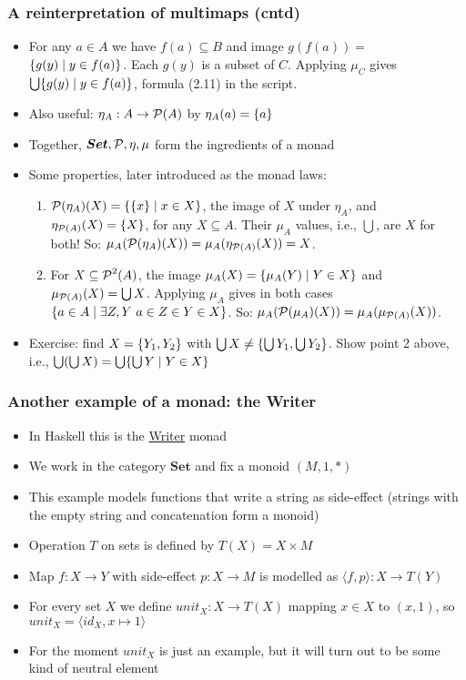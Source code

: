 \documentclass[handout]{beamer}
\newcommand{\bfsf}[1]{{\boldsymbol{#1}}}
\newcommand{\Set}{\bfsf{Set}}
\newcommand{\Kp}[1]{{\langle #1 \rangle}}
\begin{document}
\frame
  {   
    \frametitle{A reinterpretation of multimaps (cntd)}\label{Mon5:MultiMapReint}

 \begin{itemize}[<+->]
\item For any $a\in A$ we have $f(a)\subseteq B$ and {\color{red}image}
$g(f(a)) =$ $ \{g(y) \mid y\in f(a)\}$. Each $g(y)$ is a subset of $C$.
Applying $\mu_C$ gives $\bigcup \{g(y) \mid y\in f(a)\}$, formula (2.11)
in the script.
\item Also useful: $\eta_A: A \to \operatorname{\mathcal{P}}(A)$ by $\eta_A(a)=\{a\}$
\item Together, $\Set, \powset, \eta, \mu$ form the ingredients of a monad
\item Some properties, later introduced as the monad laws: 
 \begin{enumerate}
\item $\operatorname{\mathcal{P}}(\eta_A)(X) = \{\{x\}\mid x\in X\}$,
the {\color{red}image} of $X$ under $\eta_A$, and $\eta_{\operatorname{\mathcal{P}}(A)}(X) = \{X\}$,
for any $X\subseteq A$. Their $\mu_A$ values, i.e., $\bigcup$, are $X$ for both!
So: $\mu_A(\operatorname{\mathcal{P}}(\eta_A)(X)) = \mu_A(\eta_{\operatorname{\mathcal{P}}(A)}(X)) = X$.
\item For $X\subseteq \operatorname{\mathcal{P}}^2(A)$, the {\color{red}image} 
$\mu_A(X) = \{\mu_A(Y)\mid Y\in X\}$
and $\mu_{\operatorname{\mathcal{P}}(A)}(X)=\bigcup X$. Applying $\mu_A$ gives in both cases
$\set{a\in A \mid \linebreak \exists Z,Y~a\in Z\in Y \in X}$. 
So: 
$\mu_A(\operatorname{\mathcal{P}}(\mu_A)(X)) = \mu_A(\mu_{\operatorname{\mathcal{P}}(A)}(X))$.
 \end{enumerate}
\item Exercise: find $X=\{Y_1,Y_2\}$ with 
$\bigcup X \neq \{\bigcup Y_1, \bigcup Y_2\}$.
Show point 2 above, i.e., $\bigcup(\bigcup X) = \bigcup \{\bigcup Y \mid Y\in X\}$
 \end{itemize}

 }

\frame
  {   
    \frametitle{Another example of a monad: the Writer}\label{Mon5:ExaSetMone}

 \begin{itemize}[<+->]
\item In Haskell this is the 
\href{https://wiki.haskell.org/All_About_Monads\#The_Writer\_monad}%
{\color{blue}Writer} monad
\item We work in the category $\Set$ and fix a monoid $(M,1,*)$
\item This example models functions that write a string as side-effect
(strings with the empty string and concatenation form a monoid)
\item Operation $T$ on sets is defined by $T(X)= X\times M$
\item Map $f : X\to Y$ with side-effect $p : X\to M$ is modelled as $\Kp{f,p} : X\to T(Y)$
\item For every set $X$ we define $unit_X: X\to T(X)$ mapping $x\in X$ to $(x,1)$,
so $unit_X = \Kp{id_X,x\mapsto 1}$
\item For the moment $unit_X$ is just an example, but it will turn out to
be some kind of neutral element
 \end{itemize}
 }
\end{document}
